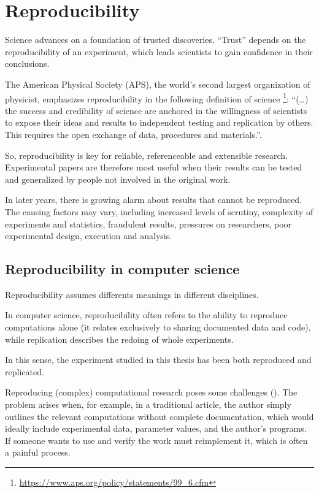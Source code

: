 \newpage
\chapter{Reproducibility}

Science advances on a foundation of trusted discoveries. ``Trust'' depends on the reproducibility of an experiment, which leads scientists to gain confidence in their conclusions. 

The American Physical Society (APS), the world's second largest organization of physicist, emphasizes reproducibility in the following definition of science \footnote{\url{https://www.aps.org/policy/statements/99_6.cfm}}: ``(\dots) the success and credibility of science are anchored in the willingness of scientists to expose their ideas and results to independent testing and replication by others. This requires the open exchange of data, procedures and materials.''.

So, reproducibility is key for reliable, referenceable and extensible research. Experimental papers are therefore most useful when their results can be tested and generalized by people not involved in the original work.

In later years, there is growing alarm about results that cannot be reproduced. The causing factors may vary, including increased levels of scrutiny, complexity of experiments and statistics, fraudulent results, pressures on researchers, poor experimental design, execution and analysis.

\section{Reproducibility in computer science}

Reproducibility assumes differents meanings in different disciplines.

In computer science, reproducibility often refers to the ability to reproduce computations alone (it relates exclusively to sharing documented data and code), while replication describes the redoing of whole experiments.

In this sense, the experiment studied in this thesis has been both reproduced and replicated.

Reproducing (complex) computational research poses some challenges (\cite{comprepro}). The problem arises when, for example, in a traditional article, the author simply outlines the relevant computations without complete documentation, which would ideally include experimental data, parameter values, and the author's programs.
If someone wants to use and verify the work must reimplement it, which is often a painful process.

